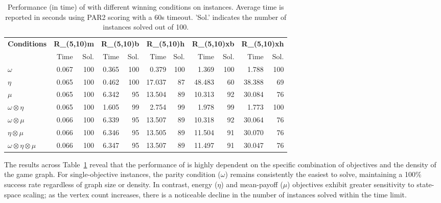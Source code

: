 \documentclass[a4paper,UKenglish,cleveref, autoref, thm-restate, anonymous]{lipics-v2021}
\begin{document}
\begin{table}[ht]
\centering
\caption{Performance (in time) of \nocq with different winning conditions on instances. Average time is reported in seconds using PAR2 scoring with a 60s timeout. 'Sol.' indicates the number of instances solved out of 100.}
\setlength{\tabcolsep}{0.9mm} %
{\small 
\begin{tabular}{l|rr|rr|rr|rr|rr}
\toprule
\textbf{Conditions} & \multicolumn{2}{c|}{\textbf{R\_(5,10)m}} & \multicolumn{2}{c|}{\textbf{R\_(5,10)b}} & \multicolumn{2}{c|}{\textbf{R\_(5,10)h}} & \multicolumn{2}{c|}{\textbf{R\_(5,10)xb}} & \multicolumn{2}{c}{\textbf{R\_(5,10)xh}} \\
& Time & Sol. & Time & Sol. & Time & Sol. & Time & Sol. & Time & Sol. \\
\midrule
\textbf{$\omega$}
    & 0.067 & 100 & 0.365 & 100 & 0.379 & 100 & 1.369 & 100 & 1.788 & 100 \\
\textbf{$\eta$}
    & 0.065 & 100 & 0.462 & 100 & 17.037 & 87 & 48.483 & 60 & 38.388 & 69 \\
\textbf{$\mu$}
    & 0.065 & 100 & 6.342 & 95 & 13.504 & 89 & 10.313 & 92 & 30.084 & 76 \\
\textbf{$\omega \otimes \eta$}
    & 0.065 & 100 & 1.605 & 99 & 2.754 & 99 & 1.978 & 99 & 1.773 & 100 \\
\textbf{$\omega \otimes \mu$}
    & 0.066 & 100 & 6.339 & 95 & 13.507 & 89 & 10.318 & 92 & 30.064 & 76 \\
\textbf{$\eta \otimes \mu$}
    & 0.066 & 100 & 6.346 & 95 & 13.505 & 89 & 11.504 & 91 & 30.070 & 76 \\
\textbf{$\omega \otimes \eta \otimes \mu$}
    & 0.066 & 100 & 6.347 & 95 & 13.507 & 89 & 11.497 & 91 & 30.047 & 76 \\
\bottomrule
\end{tabular}
}
\label{tab:quantitative}
\end{table}

The results across Table~\ref{tab:quantitative} reveal that the performance of \nocq is highly dependent on the specific combination of objectives and the density of the game graph. For single-objective instances, the parity condition ($\omega$) remains consistently the easiest to solve, maintaining a 100\% success rate regardless of graph size or density. In contrast, energy ($\eta$) and mean-payoff ($\mu$) objectives exhibit greater sensitivity to state-space scaling; as the vertex count increases, there is a noticeable decline in the number of instances solved within the time limit.
\end{document}
